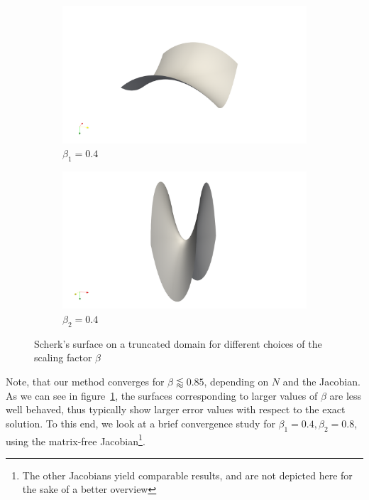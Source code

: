 \documentclass[11pt]{scrartcl}
\begin{document}
\begin{figure}[h!]
	\centering
	\begin{subfigure}{.49\linewidth}
		\includegraphics[width=\linewidth]{figs/scherk_beta4}
		\caption{$\beta_1=0.4$}
	\end{subfigure}
	\hfill
	\begin{subfigure}{.49\linewidth}
		\includegraphics[width=\linewidth]{figs/scherk_beta8}
		\caption{$\beta_2=0.4$}
	\end{subfigure}
	\caption{Scherk's surface on a truncated domain for different choices of the scaling factor $\beta$}\label{fig:scherks}
\end{figure}

Note, that our method converges for $\beta \lessapprox 0.85$, depending on $N$ and the Jacobian.
As we can see in figure~\ref{fig:scherks}, the surfaces corresponding to larger values of $\beta$ are less well behaved, thus typically show larger error values with respect to the exact solution. 
To this end, we look at a brief convergence study for $\beta_1=0.4, \beta_2=0.8$, using the matrix-free Jacobian\footnote{The other Jacobians yield comparable results, and are not depicted here for the sake of a better overview}.
\end{document}
